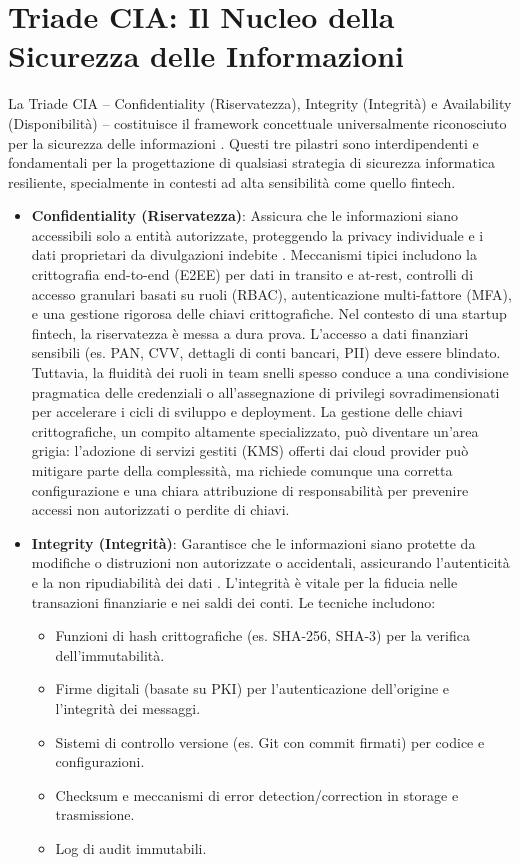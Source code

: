 \section{Triade CIA: Il Nucleo della Sicurezza delle Informazioni}
La Triade CIA – Confidentiality (Riservatezza), Integrity (Integrità) e Availability (Disponibilità) – costituisce il framework concettuale universalmente riconosciuto per la sicurezza delle informazioni \cite{NIST_SP_1800_26}. Questi tre pilastri sono interdipendenti e fondamentali per la progettazione di qualsiasi strategia di sicurezza informatica resiliente, specialmente in contesti ad alta sensibilità come quello fintech.
\begin{itemize}
\item \textbf{Confidentiality (Riservatezza)}: Assicura che le informazioni siano accessibili solo a entità autorizzate, proteggendo la privacy individuale e i dati proprietari da divulgazioni indebite \cite{NIST_SP_1800_26}. Meccanismi tipici includono la crittografia end-to-end (E2EE) per dati in transito e at-rest, controlli di accesso granulari basati su ruoli (RBAC), autenticazione multi-fattore (MFA), e una gestione rigorosa delle chiavi crittografiche.
Nel contesto di una startup fintech, la riservatezza è messa a dura prova. L'accesso a dati finanziari sensibili (es. PAN, CVV, dettagli di conti bancari, PII) deve essere blindato. Tuttavia, la fluidità dei ruoli in team snelli spesso conduce a una condivisione pragmatica delle credenziali o all'assegnazione di privilegi sovradimensionati per accelerare i cicli di sviluppo e deployment. La gestione delle chiavi crittografiche, un compito altamente specializzato, può diventare un'area grigia: l'adozione di servizi gestiti (KMS) offerti dai cloud provider può mitigare parte della complessità, ma richiede comunque una corretta configurazione e una chiara attribuzione di responsabilità per prevenire accessi non autorizzati o perdite di chiavi.

\item \textbf{Integrity (Integrità)}: Garantisce che le informazioni siano protette da modifiche o distruzioni non autorizzate o accidentali, assicurando l'autenticità e la non ripudiabilità dei dati \cite{NIST_SP_1800_26}. L'integrità è vitale per la fiducia nelle transazioni finanziarie e nei saldi dei conti. Le tecniche includono:
\begin{itemize}
    \item Funzioni di hash crittografiche (es. SHA-256, SHA-3) per la verifica dell'immutabilità.
    \item Firme digitali (basate su PKI) per l'autenticazione dell'origine e l'integrità dei messaggi.
    \item Sistemi di controllo versione (es. Git con commit firmati) per codice e configurazioni.
    \item Checksum e meccanismi di error detection/correction in storage e trasmissione.
    \item Log di audit immutabili.
\end{itemize}


\end{itemize}
